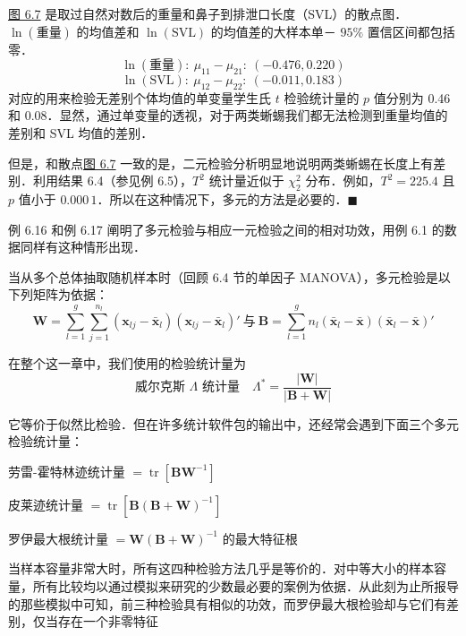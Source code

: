\hyperref[fig:6.7]{图 6.7} 是取过自然对数后的重量和鼻子到排泄口长度（SVL）的散点图．$\ln(\text{重量})$ 的均值差和 $\ln(\text{SVL})$ 的均值差的大样本单－ $95\%$ 置信区间都包括零．
\[
\ln(\text{重量}):\ \mu_{11}-\mu_{21}:\ (-0.476,0.220)
\]
\[
\ln(\text{SVL}):\ \mu_{12}-\mu_{22}:\ (-0.011,0.183)
\]
对应的用来检验无差别个体均值的单变量学生氏 $t$ 检验统计量的 $p$ 值分别为 0.46 和 0.08．显然，通过单变量的透视，对于两类蜥蜴我们都无法检测到重量均值的差别和 SVL 均值的差别．

但是，和散点\hyperref[fig:6.7]{图 6.7} 一致的是，二元检验分析明显地说明两类蜥蜴在长度上有差别．利用结果 6.4（参见例 6.5），$T^2$ 统计量近似于 $\chi_2^2$ 分布．例如，$T^2=225.4$ 且 $p$ 值小于 $0.000\,1$．所以在这种情况下，多元的方法是必要的．\hfill$\blacksquare$

例 6.16 和例 6.17 阐明了多元检验与相应一元检验之间的相对功效，用例 6.1 的数据同样有这种情形出现．

当从多个总体抽取随机样本时（回顾 6.4 节的单因子 MANOVA），多元检验是以下列矩阵为依据：
\[
\mathbf{W}=\sum_{l=1}^{g}\sum_{j=1}^{n_l}(\mathbf{x}_{lj}-\bar{\mathbf{x}}_l)(\mathbf{x}_{lj}-\bar{\mathbf{x}}_l)'\ \text{与}\
\mathbf{B}=\sum_{l=1}^{g}n_l(\bar{\mathbf{x}}_l-\bar{\mathbf{x}})(\bar{\mathbf{x}}_l-\bar{\mathbf{x}})'
\]

在整个这一章中，我们使用的检验统计量为
\[
\text{威尔克斯 } \Lambda \text{ 统计量}\quad \Lambda^*=\frac{|\mathbf{W}|}{|\mathbf{B}+\mathbf{W}|}
\]

它等价于似然比检验．但在许多统计软件包的输出中，还经常会遇到下面三个多元检验统计量：

\noindent 劳雷-霍特林迹统计量 $=\operatorname{tr}[\mathbf{B}\mathbf{W}^{-1}]$

\noindent 皮莱迹统计量 $=\operatorname{tr}[\mathbf{B}(\mathbf{B}+\mathbf{W})^{-1}]$

\noindent 罗伊最大根统计量 $=\mathbf{W}(\mathbf{B}+\mathbf{W})^{-1}$ 的最大特征根

当样本容量非常大时，所有这四种检验方法几乎是等价的．对中等大小的样本容量，所有比较均以通过模拟来研究的少数最必要的案例为依据．从此刻为止所报导的那些模拟中可知，前三种检验具有相似的功效，而罗伊最大根检验却与它们有差别，仅当存在一个非零特征
